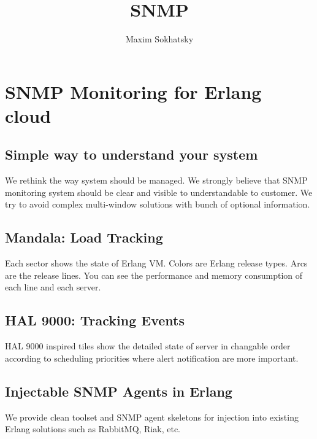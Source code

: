 \documentclass[11pt]{article}
\begin{document}
\title{SNMP}
\author{Maxim Sokhatsky}

\section*{SNMP Monitoring for Erlang cloud}
\subsection*{Simple way to understand your system}
We rethink the way system should be managed. We strongly believe that
SNMP monitoring system should be clear and visible to understandable to customer.
We try to avoid complex multi-window solutions with bunch of optional information.

\subsection*{Mandala: Load Tracking}

Each sector shows the state of Erlang VM. Colors are Erlang release types.
Arcs are the release lines. You can see the performance and memory
consumption of each line and each server.

\subsection*{HAL 9000: Tracking Events}

HAL 9000 inspired tiles show the detailed state of server in changable
order according to scheduling priorities where alert notification are more
important.

\subsection*{Injectable SNMP Agents in Erlang}
We provide clean toolset and SNMP agent skeletons for injection into existing Erlang
solutions such as RabbitMQ, Riak, etc.
\end{document}

